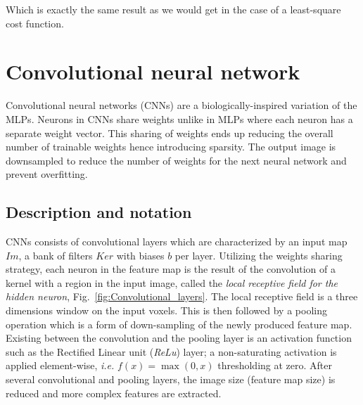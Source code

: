 \documentclass[final, paper=letter,5p,times,twocolumn]{elsarticle}
\begin{document}
Which is exactly the same result as we would get in the case of a least-square cost function. \lipsum[4-4]


\section{Convolutional neural network}

Convolutional neural networks (CNNs) are a biologically-inspired variation of the MLPs. Neurons in CNNs share weights unlike in MLPs where each neuron has a separate weight vector. This sharing of weights ends up reducing the overall number of trainable weights hence introducing sparsity. The output image is downsampled to reduce the number of weights for the next neural network and prevent overfitting.

\subsection{Description and notation}

CNNs consists of convolutional layers which are characterized by an input map $Im$, a bank of filters $Ker$ with biases $b$ per layer. Utilizing the weights sharing strategy, each neuron in the feature map is the result of the convolution of a kernel with a region in the input image, called the {\it local receptive field for the hidden neuron}, Fig.~\ref{fig:Convolutional_layers}. The local receptive field is a three dimensions window on the input voxels. This is then followed by a pooling operation which is a form of down-sampling of the newly produced feature map. Existing between the convolution and the pooling layer is an activation function such as the Rectified Linear unit ({\it ReLu}) layer; a non-saturating activation is applied element-wise, {\it i.e.} $f(x) = \max(0,x)$ thresholding at zero. After several convolutional and pooling layers, the image size (feature map size) is reduced and more complex features are extracted. \\
\end{document}
